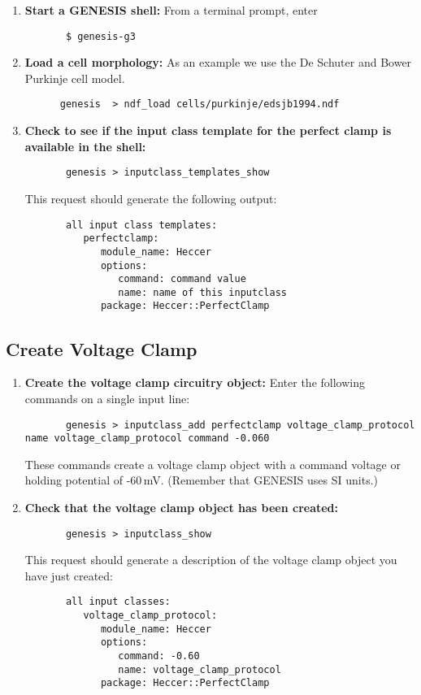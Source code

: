 \documentclass[12pt]{article}
\begin{document}
\begin{enumerate}
	\item{\bf Start a GENESIS shell:} From a terminal prompt, enter
	\begin{verbatim}
	   $ genesis-g3
	\end{verbatim}
	
	\item{\bf Load a cell morphology:} As an example we use the De Schuter and Bower Purkinje cell model.
	\begin{verbatim}
	  genesis  > ndf_load cells/purkinje/edsjb1994.ndf
	\end{verbatim}
	
	\item{\bf Check to see if the input class template for the perfect clamp is available in the shell:}
	\begin{verbatim}
	   genesis > inputclass_templates_show
	\end{verbatim}
	This request should generate the following output:
	\begin{verbatim}
	   all input class templates: 
	      perfectclamp:
	         module_name: Heccer
	         options:
	            command: command value
	            name: name of this inputclass
	         package: Heccer::PerfectClamp
	\end{verbatim}	
\end{enumerate}

\subsection*{Create Voltage Clamp}

\begin{enumerate}

	\item{\bf Create the voltage clamp circuitry object:} Enter the following commands on a single input line:
	\begin{verbatim}
	   genesis > inputclass_add perfectclamp voltage_clamp_protocol name voltage_clamp_protocol command -0.060
	\end{verbatim}
	These commands create a voltage clamp object with a command voltage or holding potential of -60\,mV. (Remember that GENESIS uses SI units.)
	
	\item{\bf Check that the voltage clamp object has been created:}
	\begin{verbatim}
	   genesis > inputclass_show
	\end{verbatim}
	This request should generate a description of the voltage clamp object you have just created:
	\begin{verbatim}
	   all input classes: 
	      voltage_clamp_protocol:
	         module_name: Heccer
	         options:
	            command: -0.60
	            name: voltage_clamp_protocol
	         package: Heccer::PerfectClamp
	\end{verbatim}
\end{enumerate}
\end{document}
